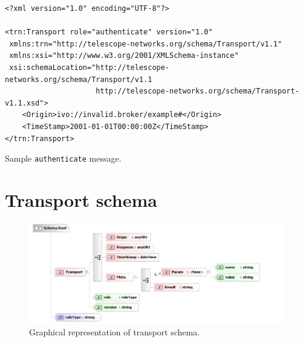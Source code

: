 \documentclass[a4paper,11pt]{ivoa}
\begin{document}
\begin{listing*}
\begin{verbatim}
<?xml version="1.0" encoding="UTF-8"?>

<trn:Transport role="authenticate" version="1.0"
 xmlns:trn="http://telescope-networks.org/schema/Transport/v1.1"
 xmlns:xsi="http://www.w3.org/2001/XMLSchema-instance"
 xsi:schemaLocation="http://telescope-networks.org/schema/Transport/v1.1
                     http://telescope-networks.org/schema/Transport-v1.1.xsd">
    <Origin>ivo://invalid.broker/example#</Origin>
    <TimeStamp>2001-01-01T00:00:00Z</TimeStamp>
</trn:Transport>
\end{verbatim}
\caption{Sample \texttt{authenticate} message.}
\label{lst:authenticate}
\end{listing*}

\appendix

\section{Transport schema}
\label{sec:transportschema}

\begin{figure}[H]
    \begin{center}
    \includegraphics{figures/transport.pdf}
    \end{center}

    \caption{Graphical representation of transport schema.}
    \label{fig:transport}
\end{figure}
\end{document}
